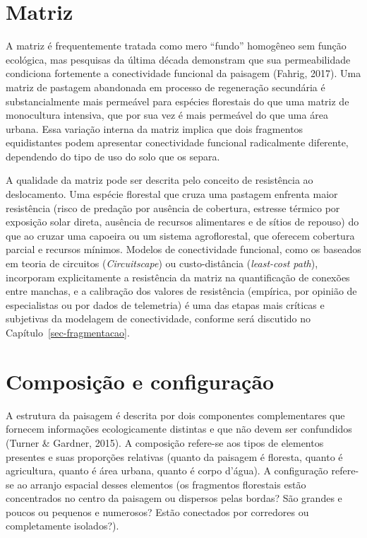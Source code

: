 \documentclass[
  portuguese,
  11pt,
  a4paper,
  open=any]{scrbook}
\begin{document}
\section{Matriz}\label{matriz}

A matriz é frequentemente tratada como mero ``fundo'' homogêneo sem
função ecológica, mas pesquisas da última década demonstram que sua
permeabilidade condiciona fortemente a conectividade funcional da
paisagem (Fahrig, 2017). Uma matriz de pastagem abandonada em processo
de regeneração secundária é substancialmente mais permeável para
espécies florestais do que uma matriz de monocultura intensiva, que por
sua vez é mais permeável do que uma área urbana. Essa variação interna
da matriz implica que dois fragmentos equidistantes podem apresentar
conectividade funcional radicalmente diferente, dependendo do tipo de
uso do solo que os separa.

A qualidade da matriz pode ser descrita pelo conceito de resistência ao
deslocamento. Uma espécie florestal que cruza uma pastagem enfrenta
maior resistência (risco de predação por ausência de cobertura, estresse
térmico por exposição solar direta, ausência de recursos alimentares e
de sítios de repouso) do que ao cruzar uma capoeira ou um sistema
agroflorestal, que oferecem cobertura parcial e recursos mínimos.
Modelos de conectividade funcional, como os baseados em teoria de
circuitos (\emph{Circuitscape}) ou custo-distância (\emph{least-cost
path}), incorporam explicitamente a resistência da matriz na
quantificação de conexões entre manchas, e a calibração dos valores de
resistência (empírica, por opinião de especialistas ou por dados de
telemetria) é uma das etapas mais críticas e subjetivas da modelagem de
conectividade, conforme será discutido no
Capítulo~\ref{sec-fragmentacao}.

\section{Composição e
configuração}\label{composiuxe7uxe3o-e-configurauxe7uxe3o}

A estrutura da paisagem é descrita por dois componentes complementares
que fornecem informações ecologicamente distintas e que não devem ser
confundidos (Turner \& Gardner, 2015). A composição refere-se aos tipos
de elementos presentes e suas proporções relativas (quanto da paisagem é
floresta, quanto é agricultura, quanto é área urbana, quanto é corpo
d'água). A configuração refere-se ao arranjo espacial desses elementos
(os fragmentos florestais estão concentrados no centro da paisagem ou
dispersos pelas bordas? São grandes e poucos ou pequenos e numerosos?
Estão conectados por corredores ou completamente isolados?).
\end{document}
